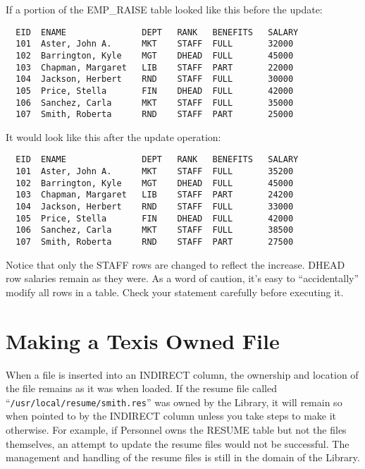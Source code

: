 If a portion of the EMP\_RAISE table looked like this before the
update:

\begin{screen}
\begin{verbatim}
  EID  ENAME               DEPT   RANK   BENEFITS   SALARY
  101  Aster, John A.      MKT    STAFF  FULL       32000
  102  Barrington, Kyle    MGT    DHEAD  FULL       45000
  103  Chapman, Margaret   LIB    STAFF  PART       22000
  104  Jackson, Herbert    RND    STAFF  FULL       30000
  105  Price, Stella       FIN    DHEAD  FULL       42000
  106  Sanchez, Carla      MKT    STAFF  FULL       35000
  107  Smith, Roberta      RND    STAFF  PART       25000
\end{verbatim}
\end{screen}

It would look like this after the update operation:

\begin{screen}
\begin{verbatim}
  EID  ENAME               DEPT   RANK   BENEFITS   SALARY
  101  Aster, John A.      MKT    STAFF  FULL       35200
  102  Barrington, Kyle    MGT    DHEAD  FULL       45000
  103  Chapman, Margaret   LIB    STAFF  PART       24200
  104  Jackson, Herbert    RND    STAFF  FULL       33000
  105  Price, Stella       FIN    DHEAD  FULL       42000
  106  Sanchez, Carla      MKT    STAFF  FULL       38500
  107  Smith, Roberta      RND    STAFF  PART       27500
\end{verbatim}
\end{screen}

Notice that only the STAFF rows are changed to reflect the increase.
DHEAD row salaries remain as they were.  As a word of caution, it's
easy to ``accidentally'' modify all rows in a table.  Check your
statement carefully before executing it.

\section{Making a Texis Owned File}

When a file is inserted into an INDIRECT column, the ownership and
location of the file remains as it was when loaded.  If the resume
file called ``\verb`/usr/local/resume/smith.res`'' was owned by the
Library, it will remain so when pointed to by the INDIRECT column
unless you take steps to make it otherwise.  For example, if Personnel
owns the RESUME table but not the files themselves, an attempt to
update the resume files would not be successful.  The management and
handling of the resume files is still in the domain of the Library.

